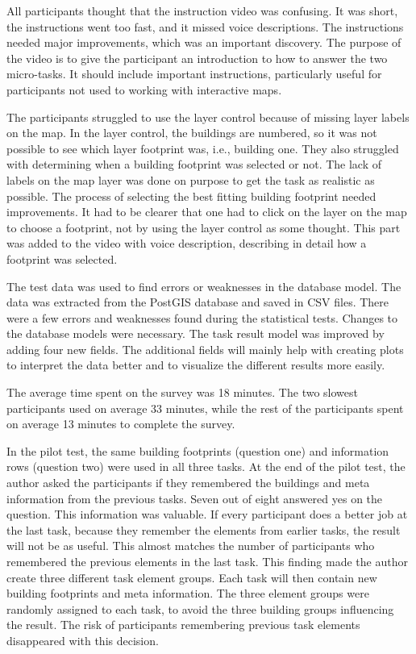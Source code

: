 All participants thought that the instruction video was confusing. It was short, the instructions went too fast, and it missed voice descriptions. The instructions needed major improvements, which was an important discovery. The purpose of the video is to give the participant an introduction to how to answer the two micro-tasks. It should include important instructions, particularly useful for participants not used to working with interactive maps. 

The participants struggled to use the layer control because of missing layer labels on the map. In the layer control, the buildings are numbered, so it was not possible to see which layer footprint was, i.e., building one. They also struggled with determining when a building footprint was selected or not. The lack of labels on the map layer was done on purpose to get the task as realistic as possible. The process of selecting the best fitting building footprint needed improvements. It had to be clearer that one had to click on the layer on the map to choose a footprint, not by using the layer control as some thought. This part was added to the video with voice description, describing in detail how a footprint was selected.

The test data was used to find errors or weaknesses in the database model. The data was extracted from the PostGIS database and saved in CSV files. There were a few errors and weaknesses found during the statistical tests. Changes to the database models were necessary. The task result model was improved by adding four new fields. The additional fields will mainly help with creating plots to interpret the data better and to visualize the different results more easily. 

The average time spent on the survey was 18 minutes. The two slowest participants used on average 33 minutes, while the rest of the participants spent on average 13 minutes to complete the survey. 

In the pilot test, the same building footprints (question one) and information rows (question two) were used in all three tasks. At the end of the pilot test, the author asked the participants if they remembered the buildings and meta information from the previous tasks. Seven out of eight answered yes on the question. This information was valuable. If every participant does a better job at the last task, because they remember the elements from earlier tasks, the result will not be as useful. This almost matches the number of participants who remembered the previous elements in the last task. This finding made the author create three different task element groups. Each task will then contain new building footprints and meta information. The three element groups were randomly assigned to each task, to avoid the three building groups influencing the result. The risk of participants remembering previous task elements disappeared with this decision. 

